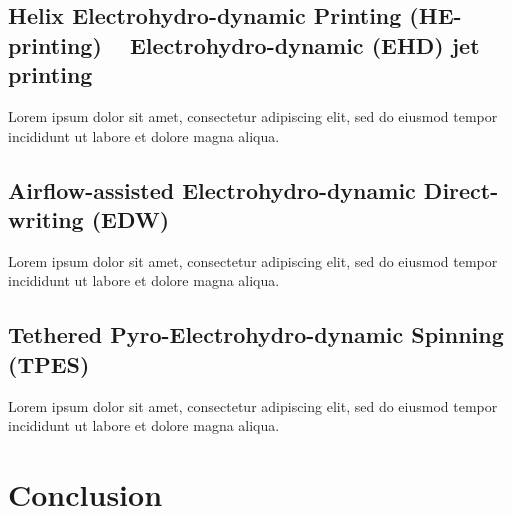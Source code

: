 \documentclass[5p,,preprint,12pt,twocolumn]{elsarticle}
\begin{document}
\subsection{Helix Electrohydro-dynamic Printing (HE-printing) \unskip~\protect\cite{527120:11974308} \mbox{}\protect\newline Electrohydro-dynamic (EHD) jet printing \unskip~\protect\cite{527120:11974320}}Lorem ipsum dolor sit amet, consectetur adipiscing elit, sed do eiusmod tempor incididunt ut labore et dolore magna aliqua.



\subsection{Airflow-assisted Electrohydro-dynamic Direct-writing (EDW) \unskip~\protect\cite{527120:11974312}}Lorem ipsum dolor sit amet, consectetur adipiscing elit, sed do eiusmod tempor incididunt ut labore et dolore magna aliqua.



\subsection{Tethered Pyro-Electrohydro-dynamic Spinning (TPES) \unskip~\protect\cite{527120:11974307}}Lorem ipsum dolor sit amet, consectetur adipiscing elit, sed do eiusmod tempor incididunt ut labore et dolore magna aliqua. 
    
\section{Conclusion}
\end{document}
